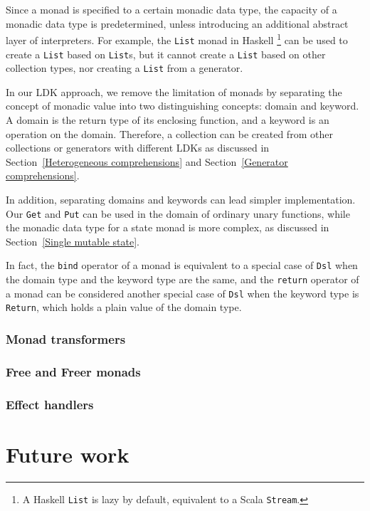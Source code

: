 Since a monad is specified to a certain monadic data type, the capacity of a monadic data type is predetermined, unless introducing an additional abstract layer of interpreters. For example, the \lstinline{List} monad in Haskell \footnote{A Haskell \lstinline{List} is lazy by default, equivalent to a Scala \lstinline{Stream}.} can be used to create a \lstinline{List} based on \lstinline{List}s, but it cannot create a \lstinline{List} based on other collection types, nor creating a \lstinline{List} from a generator.

In our LDK approach, we remove the limitation of monads by separating the concept of monadic value into two distinguishing concepts: domain and keyword. A domain is the return type of its enclosing function, and a keyword is an operation on the domain. Therefore, a collection can be created from other collections or generators with different LDKs as discussed in Section~\ref{Heterogeneous comprehensions} and Section~\ref{Generator comprehensions}. 

In addition, separating domains and keywords can lead simpler implementation. Our \lstinline{Get} and \lstinline{Put} can be used in the domain of ordinary unary functions, while the monadic data type for a state monad is more complex, as discussed in Section~\ref{Single mutable state}.

In fact, the \lstinline{bind} operator of a monad is equivalent to a special case of \lstinline{Dsl} when the domain type and the keyword type are the same, and the \lstinline{return} operator of a monad can be considered another special case of \lstinline{Dsl} when the keyword type is \lstinline{Return}, which holds a plain value of the domain type.

\subsubsection{Monad transformers}\label{Monad transformers}

\subsubsection{Free and Freer monads}\label{Free and Freer monads}

\subsubsection{Effect handlers}\label{Effect handlers}

\section{Future work}

